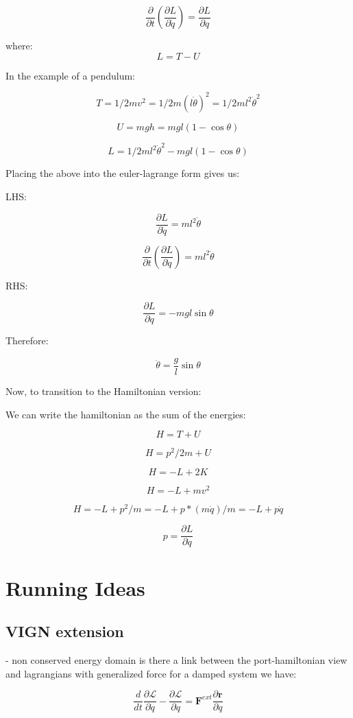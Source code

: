 \documentclass{article}
\begin{document}
$$ \frac{\partial}{\partial t} (\frac{\partial L}{\partial \dot{q}}) = \frac{\partial L}{\partial q} $$

where:
$$ L = T - U $$

In the example of a pendulum:

$$ T = 1/2 mv^2 = 1/2 m (l\dot{\theta})^2 = 1/2 m l^2 \dot{\theta}^2 $$

$$ U = mgh = mgl(1- \cos \theta) $$

$$ L = 1/2 m l^2 \dot{\theta}^2 - mgl(1-\cos\theta) $$

Placing the above into the euler-lagrange form gives us:

LHS:

$$ \frac{\partial L}{\partial \dot{q}} = ml^2 \dot{\theta}$$

$$ \frac{\partial}{\partial t} (\frac{\partial L}{\partial \dot{q}}) = ml^2 \ddot{\theta} $$

RHS:

$$ \frac{\partial L}{\partial q} = -mgl\sin\theta$$

Therefore:

$$ \ddot{\theta} = \frac{g}{l} \sin \theta $$


Now, to transition to the Hamiltonian version:

We can write the hamiltonian as the sum of the energies:

$$ H = T + U $$

$$ H = p^2/2m + U $$

$$ H = -L + 2K $$

$$ H = -L + mv^2$$

$$ H = -L + p^2/m = -L + p* (m\dot{q})/m = -L + p\dot{q}$$

$$ p = \frac{\partial L}{\partial \dot{q}} $$


\section{Running Ideas}

\subsection{VIGN extension}

- non conserved energy domain
is there a link between the port-hamiltonian view and lagrangians with generalized force
for a damped system we have:

$$ \frac{d}{dt} \frac{\partial \mathcal{L}}{\partial \dot{q}} - \frac{\partial \mathcal{L}}{\partial q} = \mathbf{F}^{ext} \frac{\partial \mathbf{r}}{\partial q}$$
\end{document}
